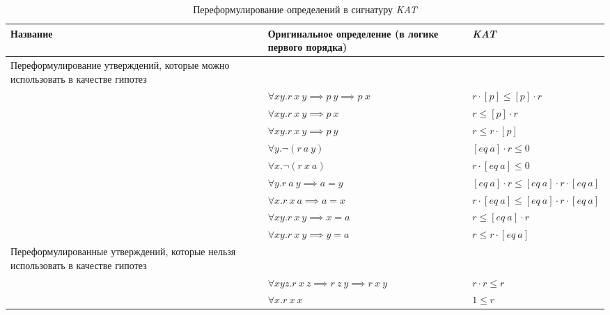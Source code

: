 \documentclass[times
              ,specification
              ,annotation
              ]{itmo-student-thesis}
\begin{document}
      \begin{table}[!h]
        \caption{Переформулирование определений в сигнатуру \textit{KAT}}
        \label{tab:redefine_succ}
        \centering
        \begin{tabularx}{\textwidth}
          {|>{\hsize}L|>{\hsize}Y|>{\hsize}Y|}\hline
          Название & Оригинальное определение (в логике первого порядка) & \textit{KAT}
          \\\hline

            {Переформулирование утверждений, которые можно использовать в качестве гипотез}
          \\\hline

           & $ \forall x y. r\ x\ y \implies p\ y \implies p\ x $ & $ r \cdot [p] \leq [p] \cdot r $
          \\\hline

           & $ \forall x y. r\ x\ y \implies p\ x $ & $ r \leq [p] \cdot r $
          \\\hline
           & $ \forall x y. r\ x\ y \implies p\ y $ & $ r \leq r \cdot [p] $
          \\\hline

           & $ \forall y. \neg (r\ a\ y)$ & $ [eq\ a] \cdot r \leq 0 $
          \\\hline
           & $ \forall x. \neg (r\ x\ a)$ & $ r \cdot  [eq\ a] \leq 0$
          \\\hline
           & $ \forall y. r\ a\ y \implies a = y $ & $ [eq\ a] \cdot r \leq [eq\ a] \cdot r \cdot
          [eq\ a] $
          \\\hline
           & $ \forall x. r\ x\ a \implies a = x $ & $ r \cdot [eq\ a] \leq [eq\ a] \cdot r \cdot [eq\ a] $
          \\\hline

           & $ \forall x y. r\ x\ y \implies x = a $ & $ r \leq [eq\ a] \cdot r$
          \\\hline
           & $ \forall x y. r\ x\ y \implies y = a $ & $ r \leq r \cdot [eq\ a]$
          \\\hline

            {Переформулированные утверждений, которые нельзя использовать в качестве гипотез}
          \\\hline
           & $ \forall x y z. r\ x\ z \implies r\ z\ y \implies r\ x\ y $ & $ r \cdot r \leq r $
          \\\hline
           & $ \forall x. r\ x\ x $ & $ 1 \leq r $
          \\\hline


\end{tabularx}
\end{table}
\end{document}
